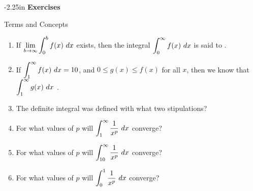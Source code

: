 \begin{adjustwidth*}{}{-2.25in}
\textbf{{\large Exercises}}
\setlength{\columnsep}{25pt}
\begin{multicols*}{2}
\noindent Terms and Concepts \small
\begin{enumerate}[1)]
\item If $\displaystyle \lim_{b\to \infty} \int_0^b f(x)\ dx$ exists, then the integral $\displaystyle \int_0^\infty f(x)\ dx$ is said to \underline{\hskip 1in}.
\item If $\ds \int_1^\infty f(x)\ dx=10$, and $0\leq g(x)\leq f(x)$ for all $x$, then we know that $\ds \int_1^\infty g(x)\ dx$  \underline{\hskip 1in}.
\item The definite integral was defined with what two stipulations?
\item For what values of $p$ will $\ds \int_1^\infty \frac1{x^p}\ dx$ converge?
\item For what values of $p$ will $\ds \int_{10}^\infty \frac1{x^p}\ dx$ converge?
\item For what values of $p$ will $\displaystyle \int_{0}^1 \frac1{x^p}\ dx$ converge?
\end{enumerate} 

 \small



\end{multicols*}
\end{adjustwidth*}
